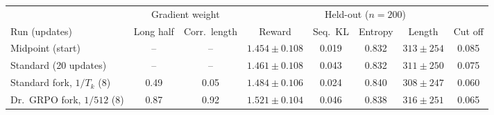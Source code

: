 \begin{adjustbox}{max width=\linewidth}
\begin{tabular}{lccccccc}
\toprule
 & \multicolumn{2}{c}{Gradient weight} & \multicolumn{5}{c}{Held-out ($n = 200$)} \\
\cmidrule(lr){2-3} \cmidrule(lr){4-8}
Run (updates) & Long half & Corr.\ length & Reward & Seq.\ KL & Entropy & Length & Cut off \\
\midrule
Midpoint (start) & -- & -- & $1.454 \pm 0.108$ & 0.019 & 0.832 & $313 \pm 254$ & 0.085 \\
Standard (20 updates) & -- & -- & $1.461 \pm 0.108$ & 0.043 & 0.832 & $311 \pm 250$ & 0.075 \\
\midrule
Standard fork, $1/T_k$ (8) & 0.49 & 0.05 & $1.484 \pm 0.106$ & 0.024 & 0.840 & $308 \pm 247$ & 0.060 \\
Dr.~GRPO fork, $1/512$ (8) & 0.87 & 0.92 & $1.521 \pm 0.104$ & 0.046 & 0.838 & $316 \pm 251$ & 0.065 \\
\bottomrule
\end{tabular}
\end{adjustbox}
